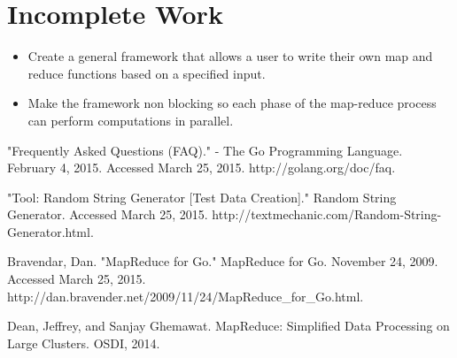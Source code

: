 \documentclass[report]{IEEEtran}
\begin{document}
\section*{Incomplete Work}
	\begin{itemize}
		\item Create a general framework that allows a user to write their own map and reduce functions based on a specified input.
		\item Make the framework non blocking so each phase of the map-reduce process can perform computations in parallel.
	\end{itemize}






%
%
%
\begin{thebibliography}{9}

"Frequently Asked Questions (FAQ)." - The Go Programming Language. 
February 4, 2015. Accessed March 25, 2015. http://golang.org/doc/faq.

"Tool: Random String Generator [Test Data Creation]." Random String Generator. 
Accessed March 25, 2015. http://textmechanic.com/Random-String-Generator.html.

Bravendar, Dan. "MapReduce for Go." MapReduce for Go. November 24, 2009. 
Accessed March 25, 2015. http://dan.bravender.net/2009/11/24/MapReduce\_for\_Go.html.

Dean, Jeffrey, and Sanjay Ghemawat. MapReduce: Simplified Data Processing on Large Clusters. OSDI, 2014.

\end{thebibliography}
\end{document}
